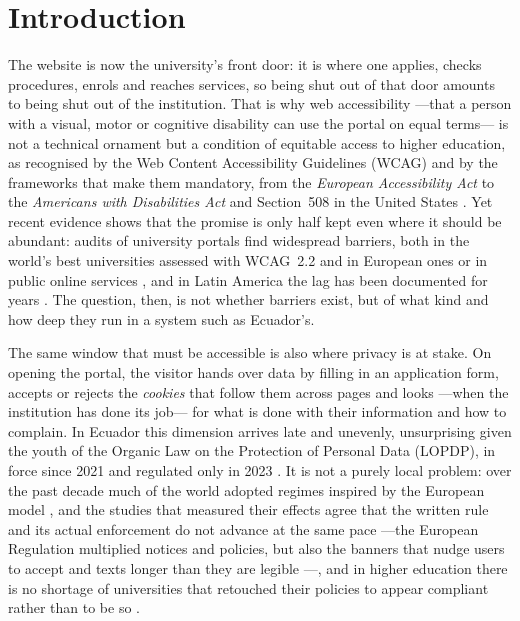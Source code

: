 \documentclass[pdflatex,sn-basic,Numbered]{sn-jnl}
\theoremstyle{thmstyleone}
\theoremstyle{thmstyletwo}
\theoremstyle{thmstylethree}
\begin{document}
\section{Introduction}\label{sec:introduction}
The website is now the university's front door: it is where one applies, checks procedures, enrols and reaches services, so being shut out of that door amounts to being shut out of the institution. That is why web accessibility ---that a person with a visual, motor or cognitive disability can use the portal on equal terms--- is not a technical ornament but a condition of equitable access to higher education, as recognised by the Web Content Accessibility Guidelines (WCAG) \citep{wcag21} and by the frameworks that make them mandatory, from the \emph{European Accessibility Act} \citep{eaa2019} to the \emph{Americans with Disabilities Act} and Section~508 in the United States \citep{ada1990,section508}. Yet recent evidence shows that the promise is only half kept even where it should be abundant: audits of university portals find widespread barriers, both in the world's best universities assessed with WCAG~2.2 \citep{krittika2025accessibility} and in European ones \citep{krejtz2025higher} or in public online services \citep{aljedaani2025egovernment}, and in Latin America the lag has been documented for years \citep{campoverdemolina2023accessibility,acostavargas2020dataset}. The question, then, is not whether barriers exist, but of what kind and how deep they run in a system such as Ecuador's.

The same window that must be accessible is also where privacy is at stake. On opening the portal, the visitor hands over data by filling in an application form, accepts or rejects the \emph{cookies} that follow them across pages and looks ---when the institution has done its job--- for what is done with their information and how to complain. In Ecuador this dimension arrives late and unevenly, unsurprising given the youth of the Organic Law on the Protection of Personal Data (LOPDP), in force since 2021 and regulated only in 2023 \citep{lopdp2021,reglamentolopdp2023}. It is not a purely local problem: over the past decade much of the world adopted regimes inspired by the European model \citep{gdpr2016}, and the studies that measured their effects agree that the written rule and its actual enforcement do not advance at the same pace ---the European Regulation multiplied notices and policies, but also the banners that nudge users to accept and texts longer than they are legible \citep{degeling2019value,kretschmer2021cookie}---, and in higher education there is no shortage of universities that retouched their policies to appear compliant rather than to be so \citep{munot2025compliance}.
\end{document}
